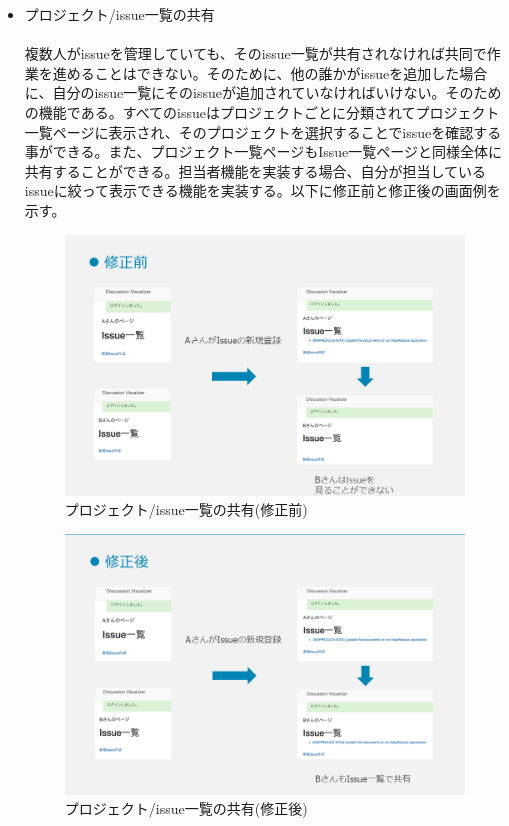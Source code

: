 \documentclass[12pt, oneside]{jreport}
\begin{document}
\begin{itemize}
			\item プロジェクト/issue一覧の共有
			\\ \\
			複数人がissueを管理していても、そのissue一覧が共有されなければ共同で作業を進めることはできない。そのために、他の誰かがissueを追加した場合に、自分のissue一覧にそのissueが追加されていなければいけない。そのための機能である。すべてのissueはプロジェクトごとに分類されてプロジェクト一覧ページに表示され、そのプロジェクトを選択することでissueを確認する事ができる。また、プロジェクト一覧ページもIssue一覧ページと同様全体に共有することができる。担当者機能を実装する場合、自分が担当しているissueに絞って表示できる機能を実装する。以下に修正前と修正後の画面例を示す。
			\begin{figure}[H]
			\centering
			\includegraphics[width=17cm,bb=200 300 -200 27]{IssShare_before.PNG}
			\caption{プロジェクト/issue一覧の共有(修正前)}
			\end{figure}
			\begin{figure}[H]
			\centering
			\includegraphics[width=17cm,bb=200 300 -200 27]{IssShare_after.PNG}
			\caption{プロジェクト/issue一覧の共有(修正後)}
			\end{figure}


\end{itemize}
\end{document}
